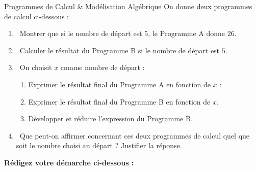 \begin{sujetdnb}{Programmes de Calcul \& Modélisation Algébrique}
On donne deux programmes de calcul ci-dessous :

\begin{center}
\begin{minipage}{0.46\linewidth}
\end{minipage}
\hfill
\begin{minipage}{0.46\linewidth}
\end{minipage}
\end{center}

\begin{enumerate}
    \item \capRealiser\ Montrer que si le nombre de départ est $5$, le Programme A donne $26$.
    \item \capRealiser\ Calculer le résultat du Programme B si le nombre de départ est $5$.
    \item \capAnalyser\ On choisit $x$ comme nombre de départ :
    \begin{enumerate}
        \item Exprimer le résultat final du Programme A en fonction de $x$ : \pointille[4cm]
        \item Exprimer le résultat final du Programme B en fonction de $x$.
        \item Développer et réduire l'expression du Programme B.
    \end{enumerate}
    \item \capValider\ Que peut-on affirmer concernant ces deux programmes de calcul quel que soit le nombre choisi au départ ? Justifier la réponse.
\end{enumerate}

\vspace{2mm}
\noindent\textbf{Rédigez votre démarche ci-dessous :}
\lignesreponse[8]
\end{sujetdnb}
